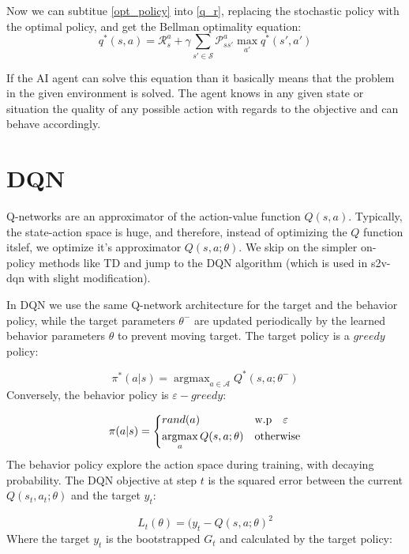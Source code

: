 \documentclass[10pt,a4paper,draft]{article}
\DeclareMathOperator*{\argmax}{argmax}
\begin{document}
Now we can subtitue \eqref{opt_policy} into \eqref{q_r}, replacing the stochastic policy with the optimal policy, and get the Bellman optimality equation:
\begin{equation}
q^*(s,a) = \mathcal{R}_s^a + \gamma\sum_{s' \in \mathcal{S}} \mathcal{P}_{ss'}^a \max_{a'} q^*(s',a')
\label{bellman_opt_q_eq}
\end{equation}

If the AI agent can solve this equation than it basically means that the problem in the given environment is solved. The agent knows in any given state or situation the quality of any possible action with regards to the objective and can behave accordingly.

\section{DQN}

Q-networks are an approximator of the action-value function $Q(s,a)$. Typically, the state-action space is huge, and therefore, instead of optimizing the $Q$ function itslef, we optimize it's approximator $Q(s,a;\theta)$. We skip on the simpler on-policy methods like TD and jump to the DQN algorithm \cite{dqn2013}(which is used in s2v-dqn with slight modification).

In DQN we use the same Q-network architecture for the target and the behavior policy, while the target parameters $\theta^-$ are updated periodically by the learned behavior parameters $\theta$ to prevent moving target. The target policy is a $greedy$ policy:

\begin{equation}
\pi^*(a|s) = \argmax_{a \in \mathcal{A}}{Q^*(s,a;\theta^-)}
\label{dqn-target-policy}
\end{equation}
Conversely, the behavior policy is $\varepsilon-greedy$:

\begin{equation}
\pi(a|s) = 
\begin{dcases}
    rand(a) 					& \text{w.p  \ \ } \varepsilon \\
    \argmax_a{Q(s,a;\theta)} 	& \text{otherwise}
\end{dcases}
\label{dqn-behavior-policy}
\end{equation}
The behavior policy explore the action space during training, with decaying probability. The DQN objective at step $t$ is the squared error between the current $Q(s_t,a_t;\theta)$ and the target $y_t$:

\begin{equation}
L_t(\theta) = (y_t - Q(s,a;\theta)^2
\label{dqn_objective}
\end{equation}
Where the target $y_t$ is the bootstrapped $G_t$ and calculated by the target policy:
\end{document}
